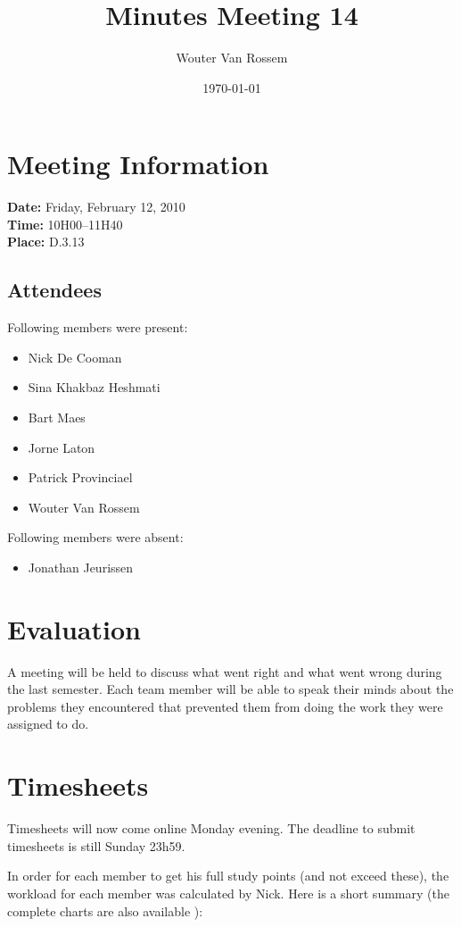 \documentclass[a4paper, 12pt]{article}
\begin{document}
\title{Minutes Meeting 14}
\author{Wouter Van Rossem}
\date{\today}

\maketitle	
	\section{Meeting Information}
		\textbf{Date:} Friday, February 12, 2010\\
		\textbf{Time:} 10H00--11H40\\
		\textbf{Place:} D.3.13\\
		\subsection{Attendees}
Following members were present:
			\begin{itemize}
				\item Nick De Cooman
				\item Sina Khakbaz Heshmati
				\item Bart Maes
				\item Jorne Laton
				\item Patrick Provinciael
				\item Wouter Van Rossem
			\end{itemize}
Following members were absent:
			\begin{itemize}
			 	\item Jonathan Jeurissen
			\end{itemize}
			
\section{Evaluation}
	A meeting will be held to discuss what went right and what went wrong during the last semester. Each team member will be able to speak their minds about the problems they encountered that prevented them from doing the work they were assigned to do.

\section{Timesheets}
	Timesheets will now come online Monday evening. The deadline to submit timesheets is still Sunday 23h59.	
	
	In order for each member to get his full study points (and not exceed these), the workload for each member was calculated by Nick. Here is a short summary (the complete charts are also available \cite{graphs}):
	
\end{document}
